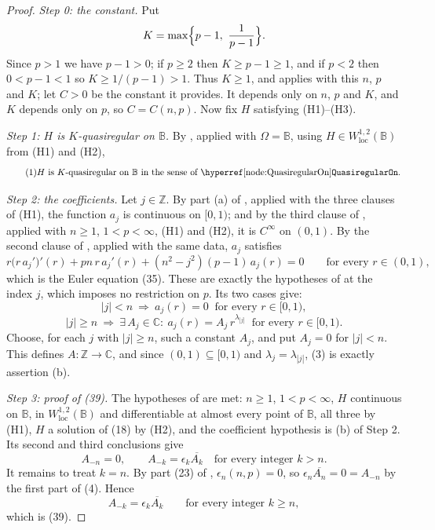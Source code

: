 \begin{proof}
\emph{Step 0: the constant.}  Put
\[
  K=\max\Bigl\{p-1,\ \frac1{p-1}\Bigr\} .
\]
Since $p>1$ we have $p-1>0$; if $p\ge2$ then $K\ge p-1\ge1$, and if $p<2$ then
$0<p-1<1$ so $K\ge1/(p-1)>1$.  Thus $K\ge1$, and
 applies with this $n$, $p$ and $K$; let $C>0$ be the
constant it provides.  It depends only on $n$, $p$ and $K$, and $K$ depends only
on $p$, so $C=C(n,p)$.  Now fix $H$ satisfying (H1)--(H3).

\emph{Step 1: $H$ is $K$-quasiregular on $\mathbb{B}$.}  By
, applied with $\Omega=\mathbb{B}$, using
$H\in W^{1,2}_{\mathrm{loc}}(\mathbb{B})$ from (H1) and (H2),
\begin{equation}\tag{1}
  H\ \text{is}\ K\text{-quasiregular on }\mathbb{B}
  \ \text{in the sense of \noderef{QuasiregularOn}} .
\end{equation}

\emph{Step 2: the coefficients.}  Let $j\in\mathbb{Z}$.  By part (a) of
, applied with the three clauses of (H1), the
function $a_j$ is continuous on $[0,1)$; and by the third clause of
, applied with $n\ge1$, $1<p<\infty$, (H1) and (H2),
it is $C^\infty$ on $(0,1)$.  By the second clause of ,
applied with the same data, $a_j$ satisfies
\[
  r\bigl(r\,a_j'\bigr)'(r)+pn\,r\,a_j'(r)+(n^2-j^2)(p-1)\,a_j(r)=0
  \qquad\text{for every }r\in(0,1),
\]
which is the Euler equation (35).  These are exactly the hypotheses of
 at the index $j$, which imposes no restriction on
$p$.  Its two cases give:
\begin{equation}\tag{2}
  |j|<n\ \Longrightarrow\ a_j(r)=0\ \text{ for every }r\in[0,1),
\end{equation}
\begin{equation}\tag{3}
  |j|\ge n\ \Longrightarrow\ \exists\,A_j\in\mathbb{C}:\
    a_j(r)=A_j\,r^{\lambda_{|j|}}\ \text{ for every }r\in[0,1) .
\end{equation}
Choose, for each $j$ with $|j|\ge n$, such a constant $A_j$, and put $A_j=0$
for $|j|<n$.  This defines $A\colon\mathbb{Z}\to\mathbb{C}$, and since
$(0,1)\subseteq[0,1)$ and $\lambda_j=\lambda_{|j|}$, (3) is exactly assertion
(b).

\emph{Step 3: proof of (39).}  The hypotheses of
 are met: $n\ge1$, $1<p<\infty$, $H$ continuous on
$\mathbb{B}$, in $W^{1,2}_{\mathrm{loc}}(\mathbb{B})$ and differentiable at
almost every point of $\mathbb{B}$, all three by (H1), $H$ a solution of (18)
by (H2), and the
coefficient hypothesis is (b) of Step 2.  Its second and
third conclusions give
\begin{equation}\tag{4}
  A_{-n}=0,\qquad A_{-k}=\epsilon_k\overline{A_k}\quad\text{for every integer }k>n .
\end{equation}
It remains to treat $k=n$.  By part (23) of ,
$\epsilon_n(n,p)=0$, so $\epsilon_n\overline{A_n}=0=A_{-n}$ by the first part of
(4).  Hence
\begin{equation}\tag{5}
  A_{-k}=\epsilon_k\overline{A_k}\qquad\text{for every integer }k\ge n,
\end{equation}
which is (39).


\end{proof}
